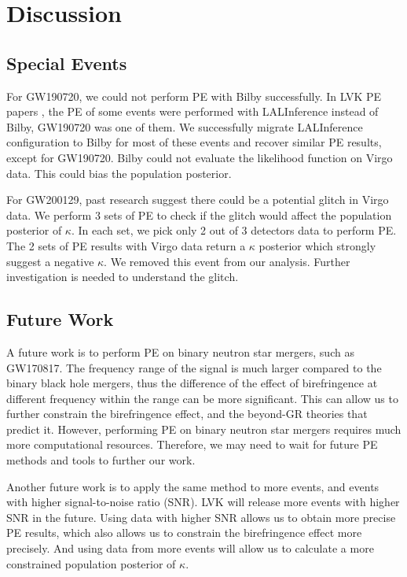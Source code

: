 \documentclass[aps,prd,twocolumn,superscriptaddress,preprintnumbers,floatfix,nofootinbib]{revtex4-2}
\begin{document}
\section{Discussion}
\label{sec:Discussion}

\subsection{Special Events}
For GW190720, we could not perform PE with Bilby successfully.
In LVK PE papers \citep{GWTC-2.1, GWTC-3}, the PE of some events were performed with LALInference \citep{lalsuite} instead of Bilby, GW190720 was one of them.
We successfully migrate LALInference configuration to Bilby for most of these events and recover similar PE results, except for GW190720.
Bilby could not evaluate the likelihood function on Virgo data.
This could bias the population posterior.

For GW200129, past research suggest there could be a potential glitch in Virgo data. \citep{GW200129}
We perform 3 sets of PE to check if the glitch would affect the population posterior of $\kappa$.
In each set, we pick only 2 out of 3 detectors data to perform PE.
The 2 sets of PE results with Virgo data return a $\kappa$ posterior which strongly suggest a negative $\kappa$.
We removed this event from our analysis.
Further investigation is needed to understand the glitch.

\subsection{Future Work}
A future work is to perform PE on binary neutron star mergers, such as GW170817.
The frequency range of the signal is much larger compared to the binary black hole mergers, thus the difference of the effect of birefringence at different frequency within the range can be more significant.
This can allow us to further constrain the birefringence effect, and the beyond-GR theories that predict it.
However, performing PE on binary neutron star mergers requires much more computational resources.
Therefore, we may need to wait for future PE methods and tools to further our work.

Another future work is to apply the same method to more events, and events with higher signal-to-noise ratio (SNR).
LVK will release more events with higher SNR in the future.
Using data with higher SNR allows us to obtain more precise PE results, which also allows us to constrain the birefringence effect more precisely.
And using data from more events will allow us to calculate a more constrained population posterior of $\kappa$.
\end{document}
